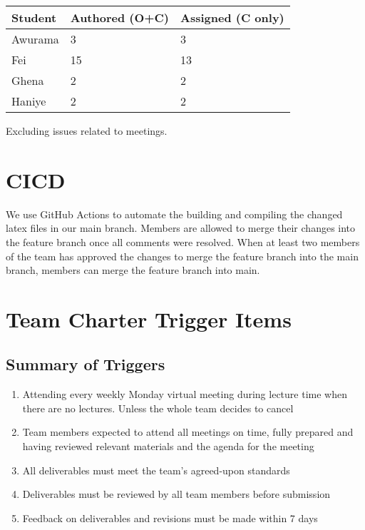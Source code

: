 \documentclass{article}
\begin{document}
\begin{table}[H]
\centering
\begin{tabular}{lll}
\toprule
\textbf{Student} & \textbf{Authored (O+C)} & \textbf{Assigned (C only)}\\
\midrule
Awurama & 3 & 3 \\
Fei & 15 & 13 \\
Ghena & 2 & 2 \\
Haniye & 2 & 2 \\
\bottomrule
\end{tabular}
\end{table}

Excluding issues related to meetings.
\section{CICD}
We use GitHub Actions to automate the building and compiling the changed latex files in our main branch.
Members are allowed to merge their changes into the feature branch once all comments were resolved.
When at least two members of the team has approved the changes to merge the feature branch into the main branch, members can merge the feature branch into main. \\


\section{Team Charter Trigger Items}

\subsection{Summary of Triggers}
\begin{enumerate}
\item{Attending every weekly Monday virtual meeting during lecture time when there are no lectures. Unless the whole team decides to cancel}
\item{Team members expected to attend all meetings on time, fully prepared and having reviewed relevant materials and the agenda for the meeting}
\item{All deliverables must meet the team's agreed-upon standards}
\item{Deliverables must be reviewed by all team members before submission}
\item{Feedback on deliverables and revisions must be made within 7 days}
\end{enumerate}
\end{document}
